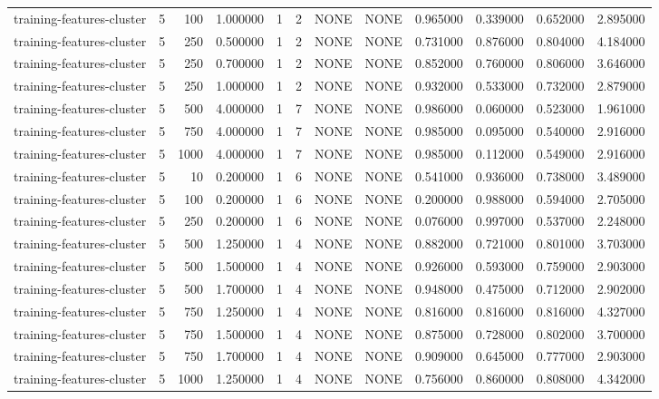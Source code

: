 \begin{tabular}{lrrrllllrrrr}
training-features-cluster & 5 & 100 & 1.000000 & 1 & 2 & NONE & NONE & 0.965000 & 0.339000 & 0.652000 & 2.895000 \\
training-features-cluster & 5 & 250 & 0.500000 & 1 & 2 & NONE & NONE & 0.731000 & 0.876000 & 0.804000 & 4.184000 \\
training-features-cluster & 5 & 250 & 0.700000 & 1 & 2 & NONE & NONE & 0.852000 & 0.760000 & 0.806000 & 3.646000 \\
training-features-cluster & 5 & 250 & 1.000000 & 1 & 2 & NONE & NONE & 0.932000 & 0.533000 & 0.732000 & 2.879000 \\
training-features-cluster & 5 & 500 & 4.000000 & 1 & 7 & NONE & NONE & 0.986000 & 0.060000 & 0.523000 & 1.961000 \\
training-features-cluster & 5 & 750 & 4.000000 & 1 & 7 & NONE & NONE & 0.985000 & 0.095000 & 0.540000 & 2.916000 \\
training-features-cluster & 5 & 1000 & 4.000000 & 1 & 7 & NONE & NONE & 0.985000 & 0.112000 & 0.549000 & 2.916000 \\
training-features-cluster & 5 & 10 & 0.200000 & 1 & 6 & NONE & NONE & 0.541000 & 0.936000 & 0.738000 & 3.489000 \\
training-features-cluster & 5 & 100 & 0.200000 & 1 & 6 & NONE & NONE & 0.200000 & 0.988000 & 0.594000 & 2.705000 \\
training-features-cluster & 5 & 250 & 0.200000 & 1 & 6 & NONE & NONE & 0.076000 & 0.997000 & 0.537000 & 2.248000 \\
training-features-cluster & 5 & 500 & 1.250000 & 1 & 4 & NONE & NONE & 0.882000 & 0.721000 & 0.801000 & 3.703000 \\
training-features-cluster & 5 & 500 & 1.500000 & 1 & 4 & NONE & NONE & 0.926000 & 0.593000 & 0.759000 & 2.903000 \\
training-features-cluster & 5 & 500 & 1.700000 & 1 & 4 & NONE & NONE & 0.948000 & 0.475000 & 0.712000 & 2.902000 \\
training-features-cluster & 5 & 750 & 1.250000 & 1 & 4 & NONE & NONE & 0.816000 & 0.816000 & 0.816000 & 4.327000 \\
training-features-cluster & 5 & 750 & 1.500000 & 1 & 4 & NONE & NONE & 0.875000 & 0.728000 & 0.802000 & 3.700000 \\
training-features-cluster & 5 & 750 & 1.700000 & 1 & 4 & NONE & NONE & 0.909000 & 0.645000 & 0.777000 & 2.903000 \\
training-features-cluster & 5 & 1000 & 1.250000 & 1 & 4 & NONE & NONE & 0.756000 & 0.860000 & 0.808000 & 4.342000 \\

\end{tabular}
